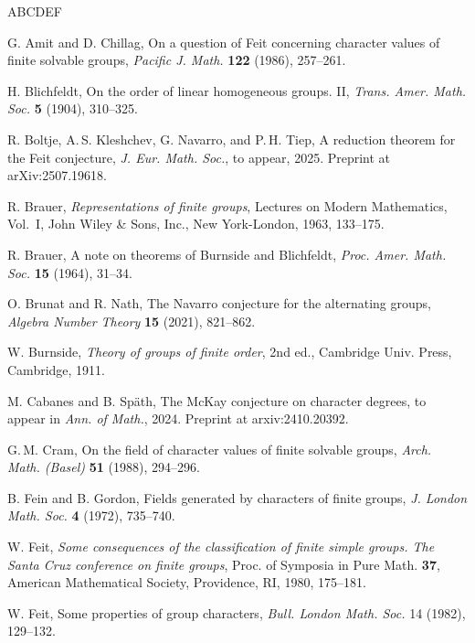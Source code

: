 \documentclass[12pt]{amsart}
\theoremstyle{definition}
\numberwithin{equation}{section}
\begin{document}
\begin{thebibliography}{ABCDEF}

{\sc G. Amit and D. Chillag}, On a question of Feit concerning
character values of finite solvable groups, \emph{Pacific J. Math.}
\textbf{122} (1986), 257--261.

{\sc H. Blichfeldt}, On the order of linear homogeneous groups. II,
\emph{Trans. Amer. Math. Soc.} \textbf{5} (1904), 310--325.


{\sc R. Boltje, A.\,S. Kleshchev, G. Navarro, and P.\,H. Tiep}, A
reduction theorem for  the Feit conjecture, \emph{J. Eur. Math.
Soc.}, to appear, 2025. Preprint at arXiv:2507.19618.

{\sc R. Brauer}, \emph{Representations of finite groups}, Lectures
on Modern Mathematics, Vol.~I, John Wiley \& Sons, Inc., New
York-London, 1963, 133--175.

{\sc R. Brauer}, A note on theorems of Burnside and Blichfeldt,
\emph{Proc. Amer. Math. Soc.} \textbf{15} (1964), 31--34.

{\sc O. Brunat and R. Nath}, The Navarro conjecture for the
alternating groups, \emph{Algebra Number Theory} \textbf{15} (2021),
821--862.

W. Burnside, \emph{Theory of groups of finite order}, 2nd ed.,
Cambridge Univ. Press, Cambridge, 1911.

{\sc M. Cabanes and B. Sp\"{a}th}, The McKay conjecture on character
degrees, to appear in \emph{Ann. of Math.}, 2024. Preprint at
arxiv:2410.20392.

{\sc G.\,M. Cram}, On the field of character values of finite
solvable groups, \emph{Arch. Math. (Basel)} \textbf{51} (1988),
294--296.

{\sc B. Fein and B. Gordon}, Fields generated by characters of
finite groups, \emph{J. London Math. Soc.} \textbf{4} (1972),
735--740.

{\sc W. Feit}, \emph{Some consequences of the classification of
finite simple groups. The Santa Cruz conference on finite groups},
Proc. of Symposia in Pure Math. \textbf{37}, American Mathematical
Society, Providence, RI, 1980, 175--181.

{\sc W. Feit}, Some properties of group characters, \emph{Bull.
London Math. Soc.} 14 (1982), 129--132.


\end{thebibliography}
\end{document}
